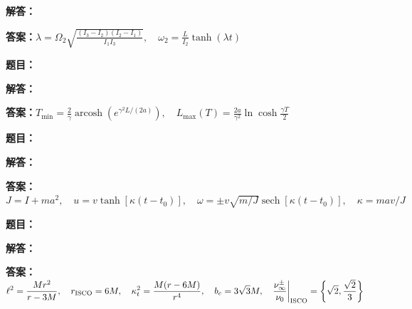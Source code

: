 \documentclass[lang=cn,color=blue,11pt]{elegantbook}
\begin{document}
\par\noindent\textbf{解答：}
\par\noindent\textbf{答案：}\(\displaystyle \lambda=\Omega_2\sqrt{\frac{(I_3-I_2)(I_2-I_1)}{I_1I_3}},\quad \omega_2=\frac{L}{I_2}\tanh(\lambda t)\)\par
\par\smallskip\noindent\hrulefill\par\medskip
{}\par
\noindent\textbf{题目：}
\par\noindent\textbf{解答：}
\par\noindent\textbf{答案：}\(\displaystyle T_{\min}=\frac2\gamma\operatorname{arcosh}\left(e^{\gamma^2L/(2a)}\right),\quad L_{\max}(T)=\frac{2a}{\gamma^2}\ln\cosh\frac{\gamma T}{2}\)\par
\par\smallskip\noindent\hrulefill\par\medskip
{}\par
\noindent\textbf{题目：}
\par\noindent\textbf{解答：}
\par\noindent\textbf{答案：}\(\displaystyle J=I+ma^2,\quad u=v\tanh[\kappa(t-t_0)],\quad \omega=\pm v\sqrt{m/J}\operatorname{sech}[\kappa(t-t_0)],\quad\kappa=mav/J\)\par
\par\smallskip\noindent\hrulefill\par\medskip
{}\par
\noindent\textbf{题目：}
\par\noindent\textbf{解答：}
\par\noindent\textbf{答案：}\(\displaystyle \ell^2=\frac{Mr^2}{r-3M},\quad r_{\rm ISCO}=6M,\quad \kappa_t^2=\frac{M(r-6M)}{r^4},\quad b_c=3\sqrt3 M,\quad \frac{\nu_\infty^\pm}{\nu_0}\bigg|_{\rm ISCO}=\left\{\sqrt2,\frac{\sqrt2}{3}\right\}\)\par
\par\smallskip\noindent\hrulefill\par\medskip
\end{document}
